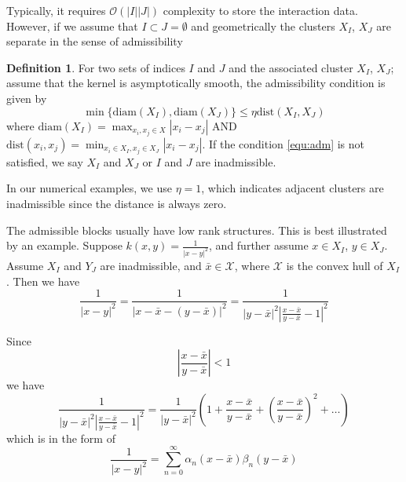 \documentclass[10pt,a4paper]{article}
\theoremstyle{definition}
\newtheorem{definition}{Definition}[section]
\begin{document}
Typically, it requires $\mathcal{O}(|I||J|)$ complexity to store the interaction data. However, if we assume that $I\subset J=\emptyset$ and geometrically the clusters $X_I$, $X_J$ are separate in the sense of admissibility

\begin{definition}
 For two sets of indices $I$ and $J$ and the associated cluster $X_I$, $X_J$; assume that the kernel is asymptotically smooth, the admissibility condition is given by
	\begin{equation}\label{equ:adm}
		\min\{\mathrm{diam}(X_I),\mathrm{diam}(X_J) \}\leq \eta \mathrm{dist}(X_I,X_J)
	\end{equation}
	where $\mathrm{diam}(X_I) = \max_{x_i,x_j\in X}|x_i-x_j|$ AND $\mathrm{dist}(x_i,x_j)=\min_{x_i\in X_I, x_j\in X_J}|x_i-x_j|$. If the condition \cref{equ:adm} is not satisfied, we say $X_I$ and $X_J$ or $I$ and $J$ are inadmissible. 
\end{definition}

In our numerical examples, we use $\eta=1$, which indicates adjacent clusters are inadmissible since the distance is always zero. 

The admissible blocks usually have low rank structures. This is best illustrated by an example. Suppose $k(x,y)=\frac{1}{|x-y|^2}$, and further assume $x\in X_I$, $y\in X_J$. Assume $X_I$ and $Y_J$ are inadmissible, and $\bar x\in \mathcal{X}$, where $\mathcal{X}$ is the convex hull of $X_I$. Then we have
\[\frac{1}{{|x - y{|^2}}} = \frac{1}{{|x - \bar x - (y - \bar x){|^2}}} = \frac{1}{{|y - \bar x{|^2}{{\left| {\frac{{x - \bar x}}{{y - \bar x}} - 1} \right|}^2}}}\]

Since 
\[\left| {\frac{{x - \bar x}}{{y - \bar x}}} \right| < 1\]
we have 
\[\frac{1}{{|y - \bar x{|^2}{{\left| {\frac{{x - \bar x}}{{y - \bar x}} - 1} \right|}^2}}} = \frac{1}{{|y - \bar x{|^2}}}\left( {1 + \frac{{x - \bar x}}{{y - \bar x}} + {{\left( {\frac{{x - \bar x}}{{y - \bar x}}} \right)}^2} +  \ldots } \right)\]
which is in the form of 
\begin{equation}
	\frac{1}{{|x - y{|^2}}} = \sum_{n=0}^\infty \alpha_n(x-\bar x)\beta_n(y-\bar x)
\end{equation}
\end{document}
